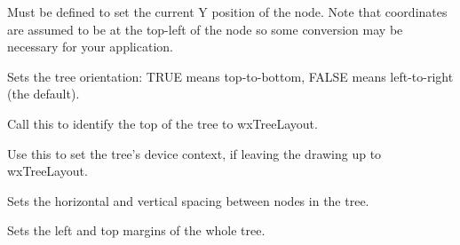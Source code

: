 Must be defined to set the current Y position of the node. Note that
coordinates are assumed to be at the top-left of the node so some conversion
may be necessary for your application.



Sets the tree orientation: TRUE means top-to-bottom, FALSE means left-to-right (the default).

\label{settopnode}


Call this to identify the top of the tree to wxTreeLayout.

\label{setdc}


Use this to set the tree's device context, if leaving the drawing up
to wxTreeLayout.



Sets the horizontal and vertical spacing between nodes in the tree.

\label{setmargins}


Sets the left and top margins of the whole tree.


